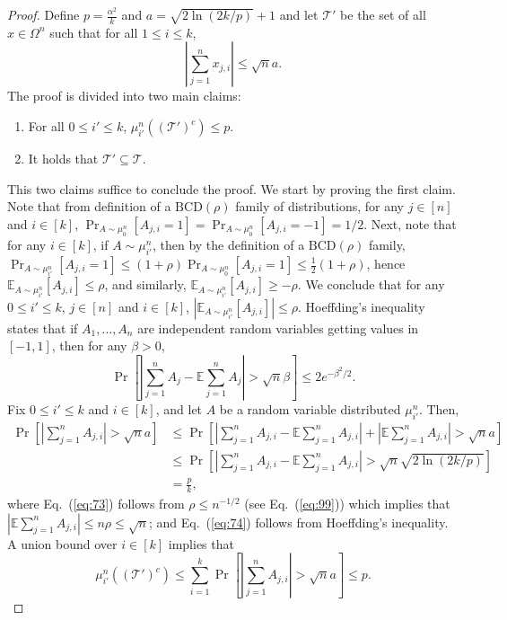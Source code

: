 \documentclass[final, 12pt]{colt2018}
\providecommand{\BCD}{\mathrm{BCD}}
\renewcommand{\eqref}[1]{Eq.~(\ref{#1})}
\begin{document}
\begin{proof}
Define $p = \frac{\alpha^2}{k}$ and $a = \sqrt{2\ln(2k/p)} + 1$ and let $\mathcal{T}'$ be the set of all $x \in \Omega^n$ such that for all $1 \le i \le k$, 
\[
\left\lvert \sum_{j=1}^n x_{j,i} \right\rvert \le \sqrt{n} a.
\]
The proof is divided into two main claims:
\begin{enumerate}
\item For all $0 \le i' \le k$, $\mu_{i'}^n\left(\left(\mathcal{T}'\right)^c\right) \le p$.
\item It holds that $\mathcal{T}' \subseteq \mathcal{T}$.
\end{enumerate}
This two claims suffice to conclude the proof. We start by proving the first claim.
Note that from definition of a $\BCD(\rho)$ family of distributions, for any $j \in [n]$ and $i \in [k]$, $\Pr_{A \sim \mu_0^n}[A_{j,i}=1]=\Pr_{A \sim \mu_0^n}[A_{j,i}=-1] = 1/2$. Next, note that for any $i \in [k]$, if $A \sim \mu_{i'}^n$, then by the definition of a $\BCD(\rho)$ family, $\Pr_{A \sim \mu_{i'}^n}[A_{j,i}=1] \le (1+\rho) \Pr_{A \sim \mu_0^n}[A_{j,i}=1] \le \frac{1}{2}(1+\rho)$, hence $\mathbb{E}_{A \sim \mu_{i'}^n}[A_{j,i}] \le \rho$, and similarly, $\mathbb{E}_{A \sim \mu_{i'}^n}[A_{j,i}] \ge -\rho$. We conclude that for any $0 \le i' \le k$, $j \in [n]$ and $i \in [k]$, $\left\lvert \mathbb{E}_{A \sim \mu_{i'}^n}[A_{j,i}] \right\rvert \le \rho$.
Hoeffding's inequality states that if $A_1, \dots, A_n$ are independent random variables getting values in $[-1,1]$, then for any $\beta > 0$,
\[
\Pr\left[ \left\lvert \sum_{j=1}^n A_j - \mathbb{E} \sum_{j=1}^n A_j \right\rvert > \sqrt{n} \beta \right]
\le 2 e^{-\beta^2/2}.
\]
Fix $0 \le i' \le k$ and $i \in [k]$, and let $A$ be a random variable distributed $\mu_{i'}^n$. Then,
\begin{align}
\Pr\left[ \left\lvert \sum_{j=1}^n A_{j,i} \right\rvert > \sqrt{n}a \right]
&\le \Pr\left[ \left\lvert \sum_{j=1}^n A_{j,i} - \mathbb{E}\sum_{j=1}^n A_{j,i} \right\rvert + \left\lvert \mathbb{E}\sum_{j=1}^n A_{j,i} \right\rvert> \sqrt{n}a  \right] \nonumber \\
&\le \Pr\left[ \left\lvert \sum_{j=1}^n A_{j,i} - \mathbb{E}\sum_{j=1}^n A_{j,i} \right\rvert > \sqrt{n}\sqrt{2\ln(2k/p)} \right] \label{eq:73}\\
&= \frac{p}{k}, \label{eq:74}
\end{align}
where \eqref{eq:73} follows from $\rho \le n^{-1/2}$ (see \eqref{eq:99}) which implies that $\left\lvert \mathbb{E} \sum_{j=1}^n A_{j,i} \right\rvert \le n \rho \le \sqrt{n}$; and \eqref{eq:74} follows from Hoeffding's inequality.
A union bound over $i \in [k]$ implies that
\[
\mu_{i'}^n \left( \left( \mathcal{T}'\right)^c \right)
\le \sum_{i =1}^k \Pr\left[ \left\lvert \sum_{j=1}^n A_{j,i} \right\rvert > \sqrt{n}a \right]
\le p.
\]


\end{proof}
\end{document}
